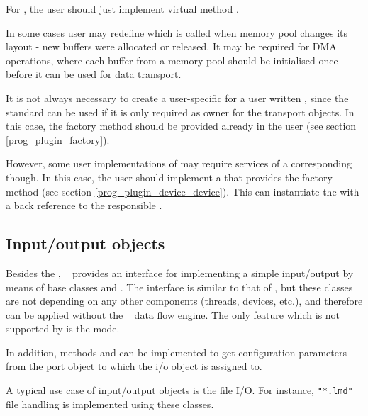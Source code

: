 For , the user should just 
implement virtual method  .  

In some cases user may redefine  which is called when
memory pool changes its layout - new buffers were allocated or released. 
It may be required for DMA operations, where each buffer from a memory pool
should be initialised once before it can be used for data transport.   

It is not always necessary to create a user-specific  for a user written , since the standard 
can be used if it is only required as owner for the transport objects.
In this case, the factory method  
should be provided  already in the user  (see section \ref{prog_plugin_factory}). 

However, some user implementations of  may require
services of a corresponding  though. In this
case, the user should implement a  that
provides the factory method  (see section \ref{prog_plugin_device_device}). This can instantiate the
 with a back reference to the responsible . 



\subsection{Input/output objects}
Besides the ,
\dabc~ provides an interface for implementing
a simple input/output by means of base classes
 and .
The interface is similar to that of ,
but these classes are not depending on 
any other components (threads, devices, etc.), 
and therefore can be applied without the  \dabc~ data flow engine.
The only feature which is not supported by  is the  
mode.

In addition, methods  and
 can be implemented to get 
configuration parameters from the port object to which the i/o object is assigned to.  

A typical use case of input/output objects is the file I/O. 
For instance, {\tt "*.lmd"} file handling is implemented
using these classes.

